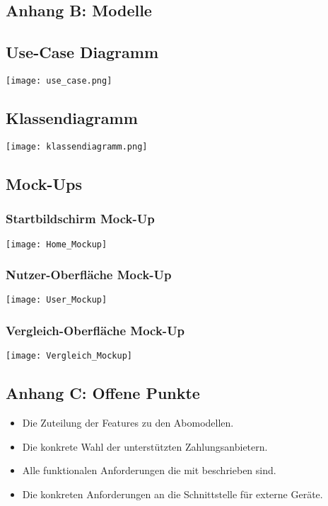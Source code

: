 \subsection*{Anhang B: Modelle}\label{sec:app_modelle}
\subsection*{Use-Case Diagramm}
\texttt{[image: use\_case.png]}

\subsection*{Klassendiagramm}
\texttt{[image: klassendiagramm.png]}

\subsection*{Mock-Ups}
\subsubsection*{Startbildschirm Mock-Up}
\texttt{[image: Home\_Mockup]}

\subsubsection*{Nutzer-Oberfläche Mock-Up}
\texttt{[image: User\_Mockup]}

\subsubsection*{Vergleich-Oberfläche Mock-Up}
\texttt{[image: Vergleich\_Mockup]}


\subsection*{Anhang C: Offene Punkte}

\begin{itemize}
	\item Die Zuteilung der Features zu den Abomodellen.
	\item Die konkrete Wahl der unterstützten Zahlungsanbietern.
	\item Alle funktionalen Anforderungen die mit  beschrieben sind.
	\item Die konkreten Anforderungen an die Schnittstelle für externe Geräte.
\end{itemize}


